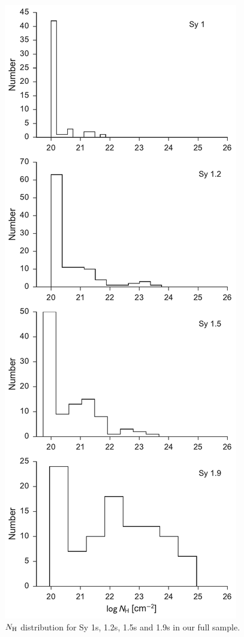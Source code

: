 \documentclass[twocolumn,trackchanges]{aastex6}
\newcommand{\nh}{$N_{\rm H}$}
\begin{document}
\begin{figure}
\includegraphics[width=\columnwidth]{../figures/nh_hists_only_sy1.pdf}
\caption{\label{fig:nh_dist}\nh{} distribution for Sy 1s, 1.2s, 1.5s and 1.9s in our full sample.}
\end{figure}
\end{document}
